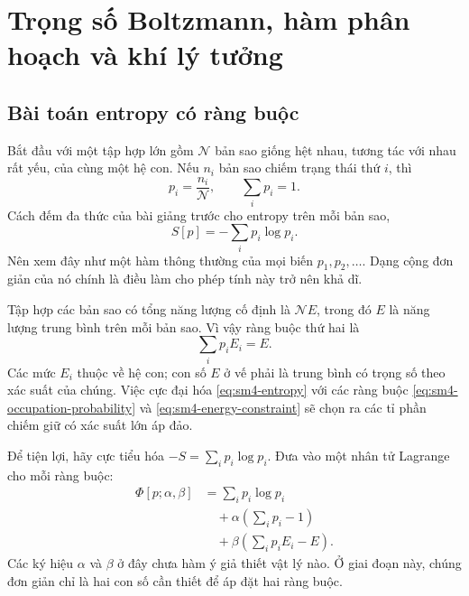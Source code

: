 \chapter{Trọng số Boltzmann, hàm phân hoạch và khí lý tưởng}


\section{Bài toán entropy có ràng buộc}

Bắt đầu với một tập hợp lớn gồm \(\mathcal N\) bản sao giống hệt nhau, tương tác với nhau rất yếu, của cùng một hệ con. Nếu \(n_i\) bản sao chiếm trạng thái thứ \(i\), thì
\begin{equation}
 p_i=\frac{n_i}{\mathcal N},
 \qquad
 \sum_i p_i=1.
 \label{eq:sm4-occupation-probability}
\end{equation}
Cách đếm đa thức của bài giảng trước cho entropy trên mỗi bản sao,
\begin{equation}
 S[p]=-\sum_i p_i\log p_i.
 \label{eq:sm4-entropy}
\end{equation}
Nên xem đây như một hàm thông thường của mọi biến \(p_1,p_2,\ldots\). Dạng cộng đơn giản của nó chính là điều làm cho phép tính này trở nên khả dĩ.

Tập hợp các bản sao có tổng năng lượng cố định là \(\mathcal N E\), trong đó
\(E\) là năng lượng trung bình trên mỗi bản sao. Vì vậy ràng buộc thứ hai là
\begin{equation}
 \sum_i p_iE_i=E.
 \label{eq:sm4-energy-constraint}
\end{equation}
Các mức \(E_i\) thuộc về hệ con; con số \(E\) ở vế phải là trung bình có trọng số theo xác suất của chúng. Việc cực đại hóa
\eqref{eq:sm4-entropy} với các ràng buộc
\eqref{eq:sm4-occupation-probability} và
\eqref{eq:sm4-energy-constraint} sẽ chọn ra các tỉ phần chiếm giữ có xác suất lớn áp đảo.

Để tiện lợi, hãy cực tiểu hóa \(-S=\sum_i p_i\log p_i\). Đưa vào một nhân tử Lagrange cho mỗi ràng buộc:
\begin{equation}
 \begin{aligned}
 \Phi[p;\alpha,\beta]
 &=\sum_i p_i\log p_i\\
 &\quad+\alpha\left(\sum_i p_i-1\right)\\
 &\quad+\beta\left(\sum_i p_iE_i-E\right).
 \end{aligned}
 \label{eq:sm4-augmented-functional}
\end{equation}
Các ký hiệu \(\alpha\) và \(\beta\) ở đây chưa hàm ý giả thiết vật lý nào. Ở giai đoạn này, chúng đơn giản chỉ là hai con số cần thiết để áp đặt hai ràng buộc.

